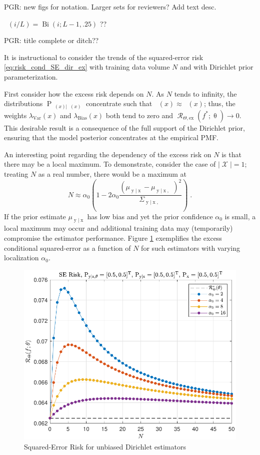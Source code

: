 \documentclass{article}
\DeclareMathOperator{\xrm}{\mathrm{x}}
\DeclareMathOperator{\yrm}{\mathrm{y}}
\DeclareMathOperator{\Prm}{\mathrm{P}}
\DeclareMathOperator{\Xcal}{\mathcal{X}}
\DeclareMathOperator{\Rcal}{\mathcal{R}}
\DeclareMathOperator{\Bi}{\mathrm{Bi}}
\DeclareMathOperator{\thetam}{\theta_\text{m}}
\DeclareMathOperator{\upthetam}{\uptheta_\text{m}}
\DeclareMathOperator{\thetac}{\theta_\text{c}}
\DeclareMathOperator{\upthetac}{\uptheta_\text{c}}
\DeclareMathOperator{\uppsim}{\uppsi_\text{m}}
\begin{document}
PGR: new figs for notation. Larger sets for reviewers? Add text desc.

$\thetac(i/L) = \Bi(i;L-1,.25)$ ??

PGR: title complete or ditch??


It is instructional to consider the trends of the squared-error risk \eqref{eq:risk_cond_SE_dir_ex} with training data volume $N$ and with Dirichlet prior parameterization. 

First consider how the excess risk depends on $N$. As $N$ tends to infinity, the distributions $\Prm_{\uppsim(x) | \upthetam(x)}$ concentrate such that $\uppsim(x) \approx \thetam(x)$; thus, the weights $\lambda_{\text{Var}}(x)$ and $\lambda_{\text{Bias}}(x)$ both tend to zero and $\Rcal_{\Theta, \mathrm{ex}}(f^* ; \uptheta) \to 0$. This desirable result is a consequence of the full support of the Dirichlet prior, ensuring that the model posterior concentrates at the empirical PMF.

An interesting point regarding the dependency of the excess risk on $N$ is that there may be a local maximum. To demonstrate, consider the case of $|\Xcal| = 1$; treating $N$ as a real number, there would be a maximum at 
\begin{equation}
N \approx \alpha_0 \left( 1 - 2 \alpha_0 \frac{\left( \mu_{\yrm | \xrm} - \mu_{\yrm | \xrm,\upthetac} \right)^2}{\Sigma_{\yrm | \xrm,\upthetac}} \right) \;.
\end{equation}
If the prior estimate $\mu_{\yrm | \xrm}$ has low bias and yet the prior confidence $\alpha_0$ is small, a local maximum may occur and additional training data may (temporarily) compromise the estimator performance. Figure \ref{fig:Risk_cond_SE_Dir_N_leg_a0_unbiased} exemplifies the excess conditional squared-error as a function of $N$ for such estimators with varying localization $\alpha_0$. 
\begin{figure}
	\centering
	\includegraphics[width=0.9\linewidth]{Risk_cond_SE_Dir_N_leg_a0_unbiased.pdf}
	\caption{Squared-Error Risk for unbiased Dirichlet estimators}
	\label{fig:Risk_cond_SE_Dir_N_leg_a0_unbiased}
\end{figure}
\end{document}
